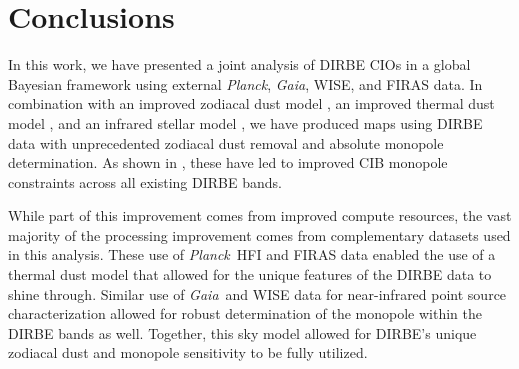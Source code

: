 \documentclass{aa}
\def\Cosmoglobe{\textsc{Cosmoglobe}}
\def\Planck{\textit{Planck}}
\def\Gaia{\textit{Gaia}}
\begin{document}
%       
%       
%       
%       
%       
%       
%       


\section{Conclusions}
\label{sec:conclusions}

In this work, we have presented a joint analysis of DIRBE CIOs in a global Bayesian framework using external \Planck, \Gaia, WISE, and FIRAS data. In combination with an improved zodiacal dust model \citep{CG02_02}, an improved thermal dust model \citep{CG02_05}, and an infrared stellar model \citep{CG02_04}, we have produced maps using DIRBE data with unprecedented zodiacal dust removal and absolute monopole determination. As shown in \citet{CG02_03}, these have led to improved CIB monopole constraints across all existing DIRBE bands.

While part of this improvement comes from improved compute resources, the vast majority of the processing improvement comes from complementary datasets used in this analysis. These use of \Planck\ HFI and FIRAS data enabled the use of a thermal dust model that allowed for the unique features of the DIRBE data to shine through. Similar use of \Gaia\ and WISE data for near-infrared point source characterization allowed for robust determination of the monopole within the DIRBE bands as well. Together, this sky model allowed for DIRBE's unique zodiacal dust and monopole sensitivity to be fully utilized.
\end{document}
